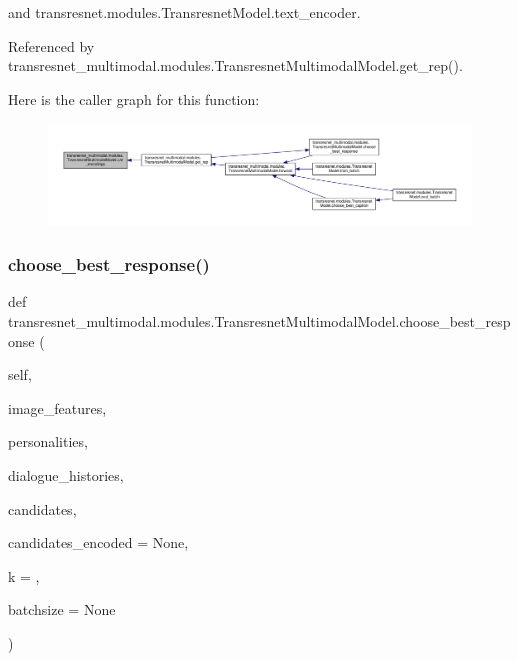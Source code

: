 and transresnet.\+modules.\+Transresnet\+Model.\+text\+\_\+encoder.



Referenced by transresnet\+\_\+multimodal.\+modules.\+Transresnet\+Multimodal\+Model.\+get\+\_\+rep().

Here is the caller graph for this function\+:
\nopagebreak
\begin{figure}[H]
\begin{center}
\leavevmode
\includegraphics[width=350pt]{classtransresnet__multimodal_1_1modules_1_1TransresnetMultimodalModel_ae3bbb2a16a997364f8a097459a8e8562_icgraph}
\end{center}
\end{figure}
\mbox{\label{classtransresnet__multimodal_1_1modules_1_1TransresnetMultimodalModel_ad1ba23a860f8af75c97510ae52622748}} 
\subsubsection{\texorpdfstring{choose\+\_\+best\+\_\+response()}{choose\_best\_response()}}
{\footnotesize\ttfamily def transresnet\+\_\+multimodal.\+modules.\+Transresnet\+Multimodal\+Model.\+choose\+\_\+best\+\_\+response (\begin{DoxyParamCaption}\item[{}]{self,  }\item[{}]{image\+\_\+features,  }\item[{}]{personalities,  }\item[{}]{dialogue\+\_\+histories,  }\item[{}]{candidates,  }\item[{}]{candidates\+\_\+encoded = {\ttfamily None},  }\item[{}]{k = {},  }\item[{}]{batchsize = {\ttfamily None} }\end{DoxyParamCaption})}


